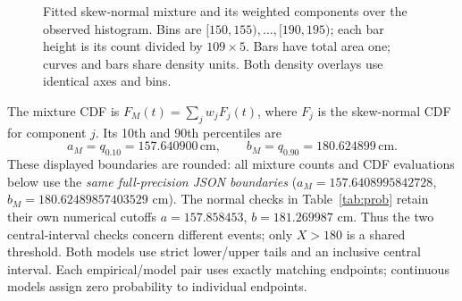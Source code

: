 \documentclass[10pt,a4paper]{article}
\newcommand{\cm}{\,\mathrm{cm}}
\begin{document}
\begin{figure}[htbp]
\caption{Fitted skew-normal mixture and its weighted components over the observed histogram.
Bins are $[150,155),\ldots,[190,195)$; each bar height is its count divided by $109\times5$.
Bars have total area one; curves and bars share density units.
Both density overlays use identical axes and bins.}
\label{fig:mixdensity}
\end{figure}

The mixture CDF is $F_M(t)=\sum_j w_j F_j(t)$, where $F_j$ is the
skew-normal CDF for component $j$. Its 10th and 90th percentiles are
\[
 a_M=q_{0.10}=157.640900\cm,\qquad
 b_M=q_{0.90}=180.624899\cm.
\]
These displayed boundaries are rounded: all mixture counts and CDF
evaluations below use the \emph{same full-precision JSON boundaries}
($a_M=157.6408995842728$, $b_M=180.62489857403529$ cm).
The normal checks in Table~\ref{tab:prob} retain their own numerical
cutoffs $a=157.858453$, $b=181.269987$ cm. Thus the two central-interval
checks concern different events; only $X>180$ is a shared threshold.
Both models use strict lower/upper tails and an inclusive central interval.
Each empirical/model pair uses exactly matching endpoints; continuous
models assign zero probability to individual endpoints.
\end{document}
